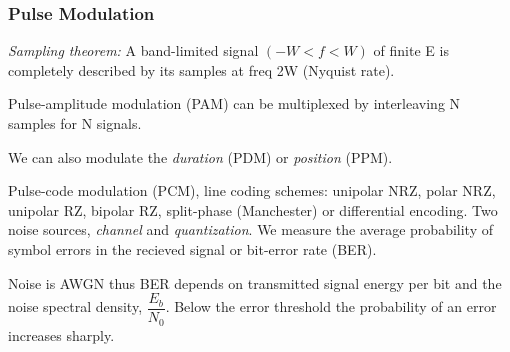 \subsubsection*{Pulse Modulation}
\emph{Sampling theorem:} A band-limited signal $(-W < f < W)$ of finite E is
completely described by its samples at freq 2W (Nyquist rate).

Pulse-amplitude modulation (PAM) can be multiplexed by interleaving N samples
for N signals.

We can also modulate the \emph{duration} (PDM) or \emph{position} (PPM).

Pulse-code modulation (PCM), line coding schemes: unipolar NRZ, polar NRZ,
unipolar RZ, bipolar RZ, split-phase (Manchester) or differential encoding.
Two noise sources, \emph{channel} and \emph{quantization}. We measure the
average probability of symbol errors in the recieved signal or bit-error rate
(BER).

Noise is AWGN thus BER depends on transmitted signal energy per bit and the
noise spectral density, $\dfrac{E_b}{N_0}$. Below the error threshold the
probability of an error increases sharply.



\clearpage

